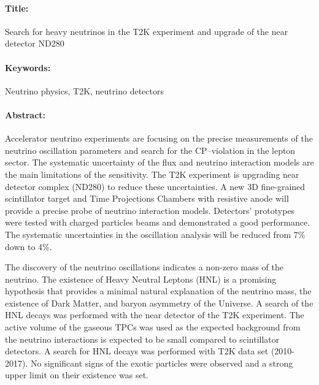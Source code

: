 \documentclass[../main.tex]{subfiles}
\begin{document}
\begin{mdframed}[linecolor=Prune,linewidth=1]
\vspace{-.25cm}
\paragraph*{Title:} Search for heavy neutrinos in the T2K experiment and upgrade of the near detector ND280

\begin{small}
\vspace{-.25cm}
\paragraph*{Keywords:} Neutrino physics, T2K, neutrino detectors

\vspace{-.5cm}
\begin{multicols}{2}
\paragraph*{Abstract:} Accelerator neutrino experiments are focusing on the precise measurements of the neutrino oscillation parameters and search for the CP--violation in the lepton sector. The systematic uncertainty of the flux and neutrino interaction models are the main limitations of the sensitivity. The T2K experiment is upgrading near detector complex (ND280) to reduce these uncertainties. A new 3D fine-grained scintillator target and Time Projections Chambers with resistive anode will provide a precise probe of neutrino interaction models. Detectors' prototypes were tested with charged particles beams and demonstrated a good performance. The systematic uncertainties in the oscillation analysis will be reduced from 7\% down to 4\%.

The discovery of the neutrino oscillations indicates a non-zero mass of the neutrino. The existence of Heavy Neutral Leptons (HNL) is a promising hypothesis that provides a minimal natural explanation of the neutrino mass, the existence of Dark Matter, and baryon asymmetry of the Universe. A search of the HNL decays was performed with the near detector of the T2K experiment. The active volume of the gaseous TPCs was used as the expected background from the neutrino interactions is expected to be small compared to scintillator detectors. A search for HNL decays was performed with T2K data set (2010-2017). No significant signs of the exotic particles were observed and a strong upper limit on their existence was set.

\end{multicols}
\end{small}
\end{mdframed}
\end{document}
